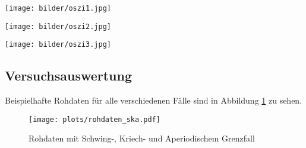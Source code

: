 \documentclass[a4paper, 12pt]{scrartcl}
\begin{document}
\begin{minipage}[t]{0.3\textwidth}
\texttt{[image: bilder/oszi1.jpg]}
\end{minipage}
\begin{minipage}[t]{0.3\textwidth}
\texttt{[image: bilder/oszi2.jpg]}
\end{minipage}
\begin{minipage}[t]{0.3\textwidth}
\texttt{[image: bilder/oszi3.jpg]}
\end{minipage}


\subsection{Versuchsauswertung}

Beispielhafte Rohdaten für alle verschiedenen Fälle sind in Abbildung \ref{abb:rohdaten_ska} zu sehen.

\begin{figure}[H]
\centering
\texttt{[image: plots/rohdaten\_ska.pdf]}
\caption{Rohdaten mit Schwing-, Kriech- und Aperiodischem Grenzfall}
\label{abb:rohdaten_ska}
\end{figure}
\end{document}
